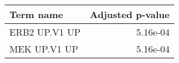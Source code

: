 \begin{tabular}{lr}
\toprule
     Term name &  Adjusted p-value \\
\midrule
 ERB2 UP.V1 UP &          5.16e-04 \\
  MEK UP.V1 UP &          5.16e-04 \\
\bottomrule
\end{tabular}
